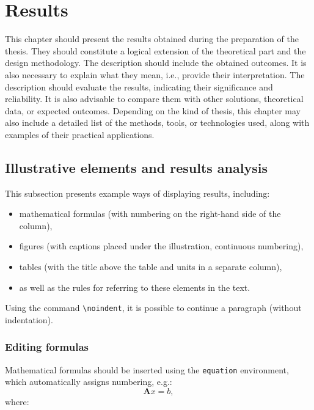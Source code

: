 \chapter{Results}\label{chapter:3_Results}
This chapter should present the results obtained during the preparation of the thesis. They should constitute a logical extension of the theoretical part and the design methodology. The description should include the obtained outcomes. It is also necessary to explain what they mean, i.e., provide their interpretation. The description should evaluate the results, indicating their significance and reliability. It is also advisable to compare them with other solutions, theoretical data, or expected outcomes. Depending on the kind of thesis, this chapter may also include a detailed list of the methods, tools, or technologies used, along with examples of their practical applications.

\section{Illustrative elements and results analysis}
\noindent This subsection presents example ways of displaying results, including:
\begin{itemize}
  \item mathematical formulas (with numbering on the right-hand side of the column),
  \item figures (with captions placed under the illustration, continuous numbering),
  \item tables (with the title above the table and units in a separate column),
  \item as well as the rules for referring to these elements in the text.
\end{itemize}

\noindent Using the command \verb|\noindent|, it is possible to continue a paragraph (without indentation).

\subsection{Editing formulas}
Mathematical formulas should be inserted using the \verb|equation| environment, which automatically assigns numbering, e.g.:
\begin{equation}
\label{eq:linear_equation}
\mathbf{A}x=b,
\end{equation}
\noindent where:

